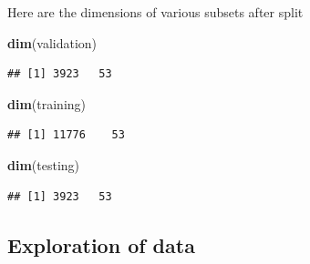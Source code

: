 \documentclass[]{article}
\newenvironment{Shaded}{\begin{snugshade}}{\end{snugshade}}
\newcommand{\KeywordTok}[1]{\textcolor[rgb]{0.13,0.29,0.53}{\textbf{{#1}}}}
\newcommand{\DataTypeTok}[1]{\textcolor[rgb]{0.13,0.29,0.53}{{#1}}}
\newcommand{\DecValTok}[1]{\textcolor[rgb]{0.00,0.00,0.81}{{#1}}}
\newcommand{\FloatTok}[1]{\textcolor[rgb]{0.00,0.00,0.81}{{#1}}}
\newcommand{\StringTok}[1]{\textcolor[rgb]{0.31,0.60,0.02}{{#1}}}
\newcommand{\NormalTok}[1]{{#1}}
\begin{document}
\begin{Shaded}
\end{Shaded}

Here are the dimensions of various subsets after split

\begin{Shaded}
\begin{Highlighting}[]
\KeywordTok{dim}\NormalTok{(validation)}
\end{Highlighting}
\end{Shaded}

\begin{verbatim}
## [1] 3923   53
\end{verbatim}

\begin{Shaded}
\begin{Highlighting}[]
\KeywordTok{dim}\NormalTok{(training)}
\end{Highlighting}
\end{Shaded}

\begin{verbatim}
## [1] 11776    53
\end{verbatim}

\begin{Shaded}
\begin{Highlighting}[]
\KeywordTok{dim}\NormalTok{(testing)}
\end{Highlighting}
\end{Shaded}

\begin{verbatim}
## [1] 3923   53
\end{verbatim}

\subsection{Exploration of data}\label{exploration-of-data}
\end{document}
